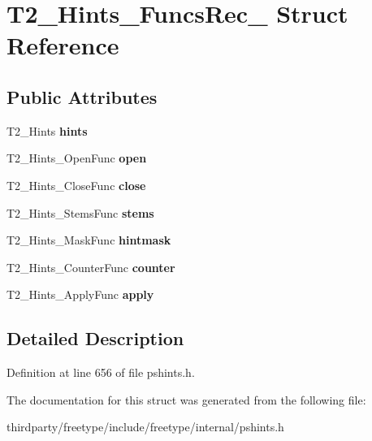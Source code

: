 \hypertarget{struct_t2___hints___funcs_rec__}{}\section{T2\+\_\+\+Hints\+\_\+\+Funcs\+Rec\+\_\+ Struct Reference}
\label{struct_t2___hints___funcs_rec__}
\subsection*{Public Attributes}
\begin{DoxyCompactItemize}
\item 
\mbox{\label{struct_t2___hints___funcs_rec___af8daab694889bede5a513fbae5f86e25}} 
T2\+\_\+\+Hints {\bfseries hints}
\item 
\mbox{\label{struct_t2___hints___funcs_rec___a1a5e0b296ee2e2ae6711b3ee35e5fcd9}} 
T2\+\_\+\+Hints\+\_\+\+Open\+Func {\bfseries open}
\item 
\mbox{\label{struct_t2___hints___funcs_rec___a7e50e26fd55254044bc9f2ba62574352}} 
T2\+\_\+\+Hints\+\_\+\+Close\+Func {\bfseries close}
\item 
\mbox{\label{struct_t2___hints___funcs_rec___a12bfd8bae5d3df8f570fcdfb70c00139}} 
T2\+\_\+\+Hints\+\_\+\+Stems\+Func {\bfseries stems}
\item 
\mbox{\label{struct_t2___hints___funcs_rec___af50d0cadda7033d7dbd27a199ccfcdd4}} 
T2\+\_\+\+Hints\+\_\+\+Mask\+Func {\bfseries hintmask}
\item 
\mbox{\label{struct_t2___hints___funcs_rec___ad9d856a64b4a8556fc8d74bae1779e11}} 
T2\+\_\+\+Hints\+\_\+\+Counter\+Func {\bfseries counter}
\item 
\mbox{\label{struct_t2___hints___funcs_rec___abaf12efb416bd79cf4ce72b13e6fc68f}} 
T2\+\_\+\+Hints\+\_\+\+Apply\+Func {\bfseries apply}
\end{DoxyCompactItemize}


\subsection{Detailed Description}


Definition at line 656 of file pshints.\+h.



The documentation for this struct was generated from the following file\+:\begin{DoxyCompactItemize}
\item 
thirdparty/freetype/include/freetype/internal/pshints.\+h\end{DoxyCompactItemize}
